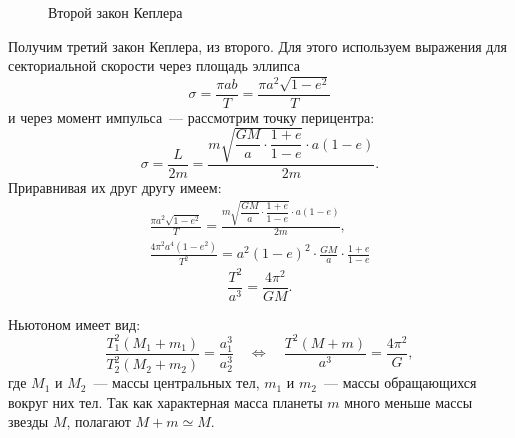 \begin{figure}[h!]
\begin{subcaptionblock}{0.5\textwidth}
        \caption {Второй закон Кеплера}
        \label{pic:second-kepler-law}
    \end{subcaptionblock}
\end{figure}

Получим третий закон Кеплера, из второго. Для этого используем выражения для секториальной скорости через площадь эллипса
\begin{equation*}
    \sigma = \frac{\pi a b}{T} = \frac{\pi a^2 \sqrt{1 - e^2}}{T}
\end{equation*}
и через момент импульса~--- рассмотрим точку перицентра:
\begin{equation*}
    \sigma = \frac{L}{2m} = \frac{m \sqrt{\dfrac{GM}{a} \cdot \dfrac{1 + e}{1 - e}} \cdot a(1-e)}{2m}.
\end{equation*}
Приравнивая их друг другу имеем:
\begin{gather*}
    \frac{\pi a^2 \sqrt{1 - e^2}}{T}
    = \frac{m \sqrt{\dfrac{GM}{a} \cdot \dfrac{1 + e}{1 - e}} \cdot a(1-e)}{2m},\\
    \frac{4\pi^2 a^4 (1 - e^2)}{T^2}
    = a^2(1-e)^2 \cdot \frac{GM}{a} \cdot \frac{1 + e}{1-e}
\end{gather*}
\begin{equation}\label{eq:kepler-third-law}
    \frac{T^2}{a^3} = \frac{4\pi^2}{GM}.
\end{equation}

 Ньютоном  имеет вид:
\begin{equation}
    \frac{T^2_1( M_1 + m_1)}{T^2_2( M_2 + m_2 )}=\frac{a^3_1}{a^3_2} \quad \Leftrightarrow \quad
    \frac{T^2 ( M + m )}{a^3} = \frac{4 \pi^2}{G},
\end{equation}
где $M_1$ и $M_2$~--- массы центральных тел, $m_1$ и
$m_2$~--- массы обращающихся вокруг них тел. Так как характерная масса планеты
$m$ много меньше массы звезды $M$, полагают $M + m \simeq M$.
